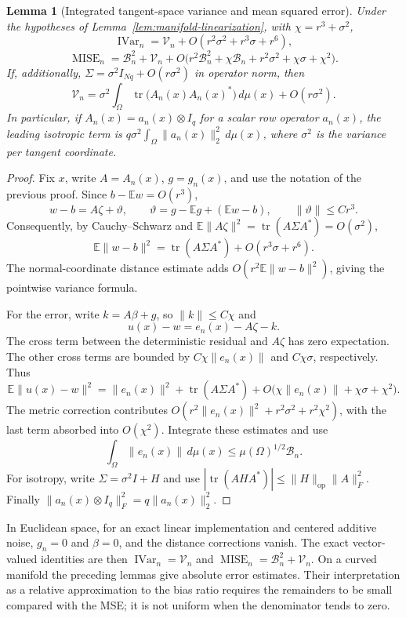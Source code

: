\documentclass[12pt]{article}
\newtheorem{lemma}[theorem]{Lemma}
\DeclareMathOperator{\mise}{MISE}
\DeclareMathOperator{\ivar}{IVar}
\begin{document}
\begin{lemma}[Integrated tangent-space variance and mean squared error]
\label{lem:manifold-variance}
Under the hypotheses of Lemma~\ref{lem:manifold-linearization}, with
$\chi=r^3+\sigma^2$,
\[
 \ivar_n=\mathcal V_n+O(r^2\sigma^2+r^3\sigma+r^6),
\]
\[
 \mise_n=\mathcal B_n^2+\mathcal V_n+
 O\bigl(r^2\mathcal B_n^2+\chi \mathcal B_n+r^2\sigma^2+\chi\sigma+\chi^2\bigr).
\]
If, additionally, $\Sigma=\sigma^2 I_{Nq}+O(r\sigma^2)$ in operator norm, then
\[
 \mathcal V_n=\sigma^2\int_\Omega\operatorname{tr}
       \bigl(A_n(x)A_n(x)^*\bigr)\,d\mu(x)+O(r\sigma^2).
\]
In particular, if $A_n(x)=a_n(x)\otimes I_q$ for a scalar row operator $a_n(x)$, the leading isotropic term is $q\sigma^2\int_\Omega\|a_n(x)\|_2^2\,d\mu(x)$, where $\sigma^2$ is the variance per tangent coordinate.
\end{lemma}

\begin{proof}
Fix $x$, write $A=A_n(x)$, $g=g_n(x)$, and use the notation of the previous proof. Since $b-\mathbb Ew=O(r^3)$,
\[
 w-b=A\zeta+\vartheta,\qquad
 \vartheta=g-\mathbb Eg+(\mathbb Ew-b),\qquad \|\vartheta\|\leq Cr^3.
\]
Consequently, by Cauchy--Schwarz and $\mathbb E\|A\zeta\|^2=\operatorname{tr}(A\Sigma A^*)=O(\sigma^2)$,
\[
 \mathbb E\|w-b\|^2
 =\operatorname{tr}(A\Sigma A^*)+O(r^3\sigma+r^6).
\]
The normal-coordinate distance estimate adds $O(r^2\mathbb E\|w-b\|^2)$, giving the pointwise variance formula.

For the error, write $k=A\beta+g$, so $\|k\|\leq C\chi$ and
\[
 u(x)-w=e_n(x)-A\zeta-k.
\]
The cross term between the deterministic residual and $A\zeta$ has zero expectation. The other cross terms are bounded by $C\chi\|e_n(x)\|$ and $C\chi\sigma$, respectively. Thus
\[
 \mathbb E\|u(x)-w\|^2
 =\|e_n(x)\|^2+\operatorname{tr}(A\Sigma A^*)
 +O\bigl(\chi\|e_n(x)\|+\chi\sigma+\chi^2\bigr).
\]
The metric correction contributes $O(r^2\|e_n(x)\|^2+r^2\sigma^2+r^2\chi^2)$, with the last term absorbed into $O(\chi^2)$. Integrate these estimates and use
\[
 \int_\Omega\|e_n(x)\|\,d\mu(x)
 \leq\mu(\Omega)^{1/2}\mathcal B_n.
\]
For isotropy, write $\Sigma=\sigma^2 I+H$ and use $|\operatorname{tr}(AHA^*)|\leq\|H\|_{\mathrm{op}}\|A\|_F^2$. Finally $\|a_n(x)\otimes I_q\|_F^2=q\|a_n(x)\|_2^2$.
\end{proof}

In Euclidean space, for an exact linear implementation and centered additive noise, $g_n=0$ and $\beta=0$, and the distance corrections vanish. The exact vector-valued identities are then $\ivar_n=\mathcal V_n$ and $\mise_n=\mathcal B_n^2+\mathcal V_n$. On a curved manifold the preceding lemmas give absolute error estimates. Their interpretation as a relative approximation to the bias ratio requires the remainders to be small compared with the MSE; it is not uniform when the denominator tends to zero.
\end{document}
